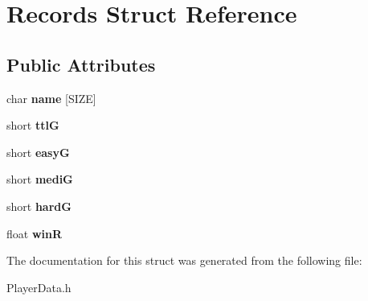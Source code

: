 \hypertarget{struct_records}{}\section{Records Struct Reference}
\label{struct_records}
\subsection*{Public Attributes}
\begin{DoxyCompactItemize}
\item 
\hypertarget{struct_records_a58f2ed25b7336b32aa1bb21471dcfabb}{}char {\bfseries name} \mbox{[}S\+I\+Z\+E\mbox{]}\label{struct_records_a58f2ed25b7336b32aa1bb21471dcfabb}

\item 
\hypertarget{struct_records_aee9b7eedb0ec49d7d781d91fca423c93}{}short {\bfseries ttl\+G}\label{struct_records_aee9b7eedb0ec49d7d781d91fca423c93}

\item 
\hypertarget{struct_records_aeabc63ddad6475f826dc90d0822aaba9}{}short {\bfseries easy\+G}\label{struct_records_aeabc63ddad6475f826dc90d0822aaba9}

\item 
\hypertarget{struct_records_a36b98e875d0d6832ec41b3c8042e0d20}{}short {\bfseries medi\+G}\label{struct_records_a36b98e875d0d6832ec41b3c8042e0d20}

\item 
\hypertarget{struct_records_a49279d66019c93905f449bd144e798bc}{}short {\bfseries hard\+G}\label{struct_records_a49279d66019c93905f449bd144e798bc}

\item 
\hypertarget{struct_records_a16bd7c4ff4c92377963b482f44c7eb17}{}float {\bfseries win\+R}\label{struct_records_a16bd7c4ff4c92377963b482f44c7eb17}

\end{DoxyCompactItemize}


The documentation for this struct was generated from the following file\+:\begin{DoxyCompactItemize}
\item 
Player\+Data.\+h\end{DoxyCompactItemize}
